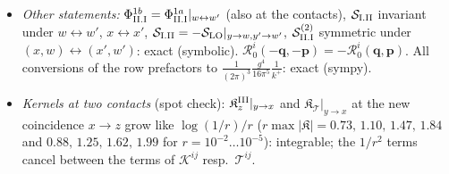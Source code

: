 \begin{itemize}
\item \emph{Other statements:} $\Phi^{1b}_{\rm II.I}=\Phi^{1a}_{\rm II.I}|_{w\leftrightarrow w'}$ (also at the contacts), $\mathcal{S}_{\rm I.II}$ invariant under $w\leftrightarrow w'$, $x\leftrightarrow x'$, $\mathcal{S}_{\rm I.II}=-\mathcal{S}_{\rm LO}|_{y\to w,y'\to w'}$, $\mathcal{S}^{(2)}_{\rm II.I}$ symmetric under $(x,w)\leftrightarrow(x',w')$: exact (symbolic). $\mathcal{R}^{i}_{0}(-\mathbf{q},-\mathbf{p})=-\mathcal{R}^{i}_{0}(\mathbf{q},\mathbf{p})$. All conversions of the row prefactors to $\frac{1}{(2\pi)^{3}}\frac{g^{4}}{16\pi^{5}}\frac{1}{k^{+}}$: exact (sympy).
\item \emph{Kernels at two contacts} (spot check): $\mathfrak{K}^{\rm III}_{z}|_{y\to x}$ and $\mathfrak{K}_{\mathcal{T}}|_{y\to x}$ at the new coincidence $x\to z$ grow like $\log(1/r)/r$ ($r\max|\mathfrak{K}|=0.73,\,1.10,\,1.47,\,1.84$ and $0.88,\,1.25,\,1.62,\,1.99$ for $r=10^{-2}\dots10^{-5}$): integrable; the $1/r^{2}$ terms cancel between the terms of $\mathcal{K}^{ij}$ resp.\ $\mathcal{T}^{ij}$.
\end{itemize}

